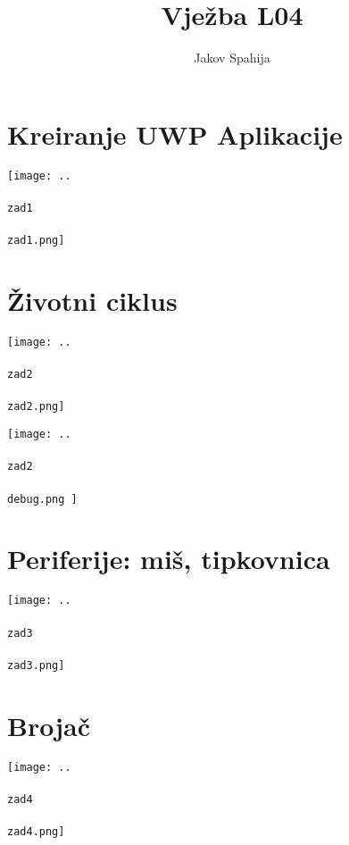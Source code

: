 
\usepackage{hyperref}
\usepackage[perpage,bottom]{footmisc}

\newcommand{\basedir}{~/FESB/2. semestar/3D Simulacije/Izvještaji/vjezba4}
\title{Vježba L04}
\author{Jakov Spahija}


\maketitle
\vspace{15em}
\tableofcontents
\pagebreak

\section{Kreiranje UWP Aplikacije}
\label{sec:UWP}
\setcounter{lstlisting}{0}

\texttt{[image: ..\\\\zad1\\\\zad1.png]}

\pagebreak

\section{Životni ciklus}
\label{sec:cycle}
\setcounter{lstlisting}{0}

\texttt{[image: ..\\\\zad2\\\\zad2.png]}

\vspace{2em}
\texttt{[image:  ..\\\\zad2\\\\debug.png ]}

\pagebreak

\section{Periferije: miš, tipkovnica}
\label{sec:input}
\setcounter{lstlisting}{0}

\texttt{[image: ..\\\\zad3\\\\zad3.png]}

\pagebreak

\section{Brojač}
\label{sec:timer}
\setcounter{lstlisting}{0}

\texttt{[image: ..\\\\zad4\\\\zad4.png]}

\pagebreak



